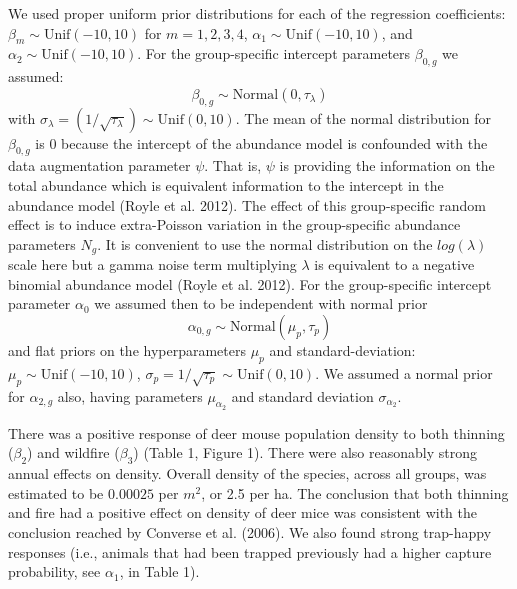 We used proper uniform prior distributions for each of the regression
coefficients: $\beta_{m} \sim \mbox{Unif}(-10,10)$ for $m=1,2,3,4$,
$\alpha_{1} \sim \mbox{Unif}(-10,10)$, and $\alpha_{2} \sim
\mbox{Unif}(-10,10)$. 
For 
the group-specific intercept parameters $\beta_{0,g}$  we assumed:
\[
\beta_{0,g} \sim \mbox{Normal}(0,\tau_{\lambda})
\]
with 
$\sigma_{\lambda} = (1/\sqrt{\tau_{\lambda}}) \sim
\mbox{Unif}(0,10)$.
The mean of the normal distribution for $\beta_{0,g}$ is 0 because the
intercept of the abundance model is confounded with the data
augmentation parameter $\psi$. That is, $\psi$ is providing the
information on the total abundance which is equivalent information to
the intercept in the abundance model (Royle et al. 2012).  The effect
of this group-specific random effect is to induce extra-Poisson
variation in the group-specific abundance parameters $N_{g}$. It is
convenient to use the normal distribution on the $log(\lambda)$ scale
here but a gamma noise term multiplying $\lambda$ is equivalent to a
negative binomial abundance model (Royle et al. 2012).
 For the group-specific intercept parameter
$\alpha_{0}$ we assumed then to be independent with normal prior
\[
\alpha_{0,g}\sim \mbox{Normal}(\mu_{p},\tau_{p})
\]
and flat priors on the hyperparameters $\mu_{p}$ and
standard-deviation: $\mu_{p} \sim \mbox{Unif}(-10,10)$,
$\sigma_{p}=1/\sqrt{\tau_{p}} \sim \mbox{Unif}(0,10)$.  We assumed a
normal prior for $\alpha_{2,g}$ also, having parameters $\mu_{\alpha_{2}}$
and standard deviation $\sigma_{\alpha_{2}}$.



There was a positive response of deer mouse population density to both
thinning ($\beta_{2}$) and wildfire ($\beta_{3}$) (Table 1, Figure
1). There were also reasonably strong annual effects on
density. Overall density of the species, across all groups, was
estimated to be $0.00025$ per $m^{2}$, or 2.5 per ha. The conclusion
that both thinning and fire had a positive effect on density of
deer mice was consistent with the conclusion reached by Converse et
al. (2006).
We also found strong trap-happy responses (i.e., animals that had been
trapped previously had a higher capture probability, see $\alpha_{1}$,
in Table 1).

